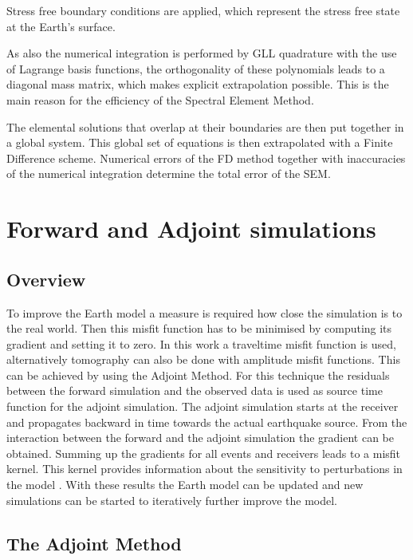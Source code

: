 Stress free boundary conditions are applied, which represent the stress free state at the Earth's surface. 

As also the numerical integration is performed by GLL quadrature with the use of Lagrange basis functions, the orthogonality of these polynomials 
leads to a diagonal mass matrix, which makes explicit extrapolation possible. This is the main reason for the efficiency of the Spectral Element Method.

The elemental solutions that overlap at their boundaries are then put together in a global system. 
This global set of equations is then extrapolated with a Finite Difference scheme.
Numerical errors of the FD method together with inaccuracies of the numerical integration determine the total error of the SEM.



\section{Forward and Adjoint simulations}


\subsection{Overview}
To improve the Earth model a measure is required how close the simulation is to the real world. 
Then this misfit function has to be minimised by computing its gradient and setting it to zero. 
In this work a traveltime misfit function is used, alternatively tomography can also be done with amplitude misfit functions.
This can be achieved by using the Adjoint Method. For this technique the residuals between the forward simulation and the observed 
data is used as source time function %
for the adjoint simulation. 
The adjoint simulation starts at the receiver and propagates backward in time towards the actual earthquake source.
From the interaction between the forward and the adjoint simulation the gradient can be obtained. 
Summing up the gradients for all events and receivers leads to a misfit kernel. 
This kernel provides information about the sensitivity to perturbations in the model \citep{Magnoni2012}.
With these results the Earth model can be updated and new simulations can be started to iteratively further improve the model.


\subsection{The Adjoint Method}


